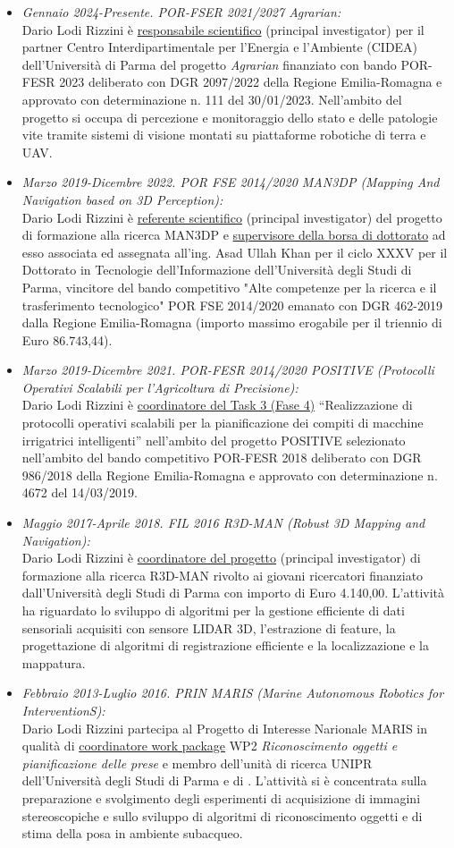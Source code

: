 \documentclass[11pt]{article}
\newcommand{\ITEMDATE}[1]{\item \textit{#1:}\\}
\begin{document}
\begin{itemize}

\ITEMDATE{Gennaio 2024-Presente. POR-FSER 2021/2027 Agrarian}
Dario Lodi Rizzini \`e \ul{responsabile scientifico} (principal investigator) per il partner Centro Interdipartimentale per l'Energia e l'Ambiente (CIDEA) dell'Universit\`a di Parma del progetto \emph{Agrarian} finanziato con bando POR-FESR 2023 deliberato con DGR 2097/2022 della Regione Emilia-Romagna e approvato con determinazione n. 111 del 30/01/2023. 
Nell'ambito del progetto si occupa di percezione e monitoraggio dello stato e delle patologie vite tramite sistemi di visione montati su piattaforme robotiche di terra e UAV.  

\ITEMDATE{Marzo 2019-Dicembre 2022. POR FSE 2014/2020 MAN3DP (Mapping And Navigation based on 3D Perception)}
Dario Lodi Rizzini \`e \ul{referente scientifico} (principal investigator) del progetto di formazione alla ricerca MAN3DP
e \ul{supervisore della borsa di dottorato} ad esso associata ed assegnata all'ing. Asad Ullah Khan per il ciclo
XXXV per il Dottorato in Tecnologie dell'Informazione dell'Universit\`a degli Studi di Parma,
vincitore del bando competitivo "Alte competenze per la ricerca e il trasferimento tecnologico"
POR FSE 2014/2020 emanato con DGR 462-2019 dalla Regione Emilia-Romagna (importo
massimo erogabile per il triennio di Euro 86.743,44). 

\ITEMDATE{Marzo 2019-Dicembre 2021. POR-FESR 2014/2020 POSITIVE (Protocolli Operativi Scalabili per l'Agricoltura di Precisione)}
Dario Lodi Rizzini \`e \ul{coordinatore del Task 3 (Fase 4)} ``Realizzazione di protocolli operativi scalabili per la
pianificazione dei compiti di macchine irrigatrici intelligenti'' nell'ambito del progetto POSITIVE
selezionato nell'ambito del bando competitivo POR-FESR 2018 deliberato con DGR 986/2018 della Regione Emilia-Romagna e
approvato con determinazione n. 4672 del 14/03/2019.

\ITEMDATE{Maggio 2017-Aprile 2018.  FIL 2016 R3D-MAN (Robust 3D Mapping and Navigation)}
Dario Lodi Rizzini \`e \ul{coordinatore del progetto} (principal investigator) di formazione alla ricerca R3D-MAN rivolto ai giovani 
ricercatori finanziato dall'Universit\`a degli Studi di Parma con importo di Euro 4.140,00. 
L'attivit\`a ha riguardato lo sviluppo di algoritmi per la gestione efficiente di dati sensoriali 
acquisiti con sensore LIDAR 3D, l'estrazione di feature, la progettazione di algoritmi di registrazione 
efficiente e la localizzazione e la mappatura. 

\ITEMDATE{Febbraio 2013-Luglio 2016. PRIN MARIS (Marine Autonomous Robotics for InterventionS)} 
Dario Lodi Rizzini partecipa al Progetto di Interesse Narionale MARIS in qualit\`a di 
\ul{coordinatore work package} WP2 \emph{Riconoscimento oggetti e pianificazione delle prese}
e membro dell'unit\`a di ricerca UNIPR dell'Universit\`a degli Studi di Parma e di . 
L'attivit\`a si \`e concentrata sulla preparazione e svolgimento degli esperimenti
di acquisizione di immagini stereoscopiche e sullo sviluppo di algoritmi di riconoscimento 
oggetti e di stima della posa in ambiente subacqueo.

\end{itemize}
\end{document}
